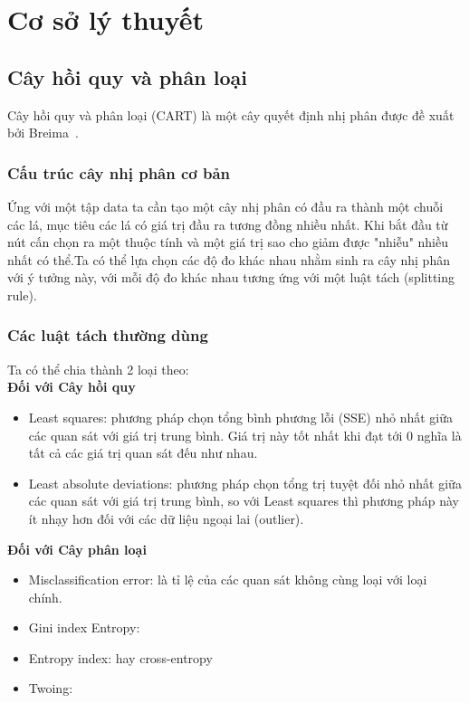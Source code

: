 \chapter{Cơ sở lý thuyết}
\section{Cây hồi quy và phân loại}
Cây hồi quy và phân loại (CART) là một cây quyết định nhị phân được đề xuất bởi Breima~\cite{1}.\\

\subsection{Cấu trúc cây nhị phân cơ bản}
 Ứng  với một tập data ta cần tạo một  cây nhị phân có đầu ra thành một chuỗi các lá, mục tiêu các lá có giá trị đầu ra tương đồng nhiều nhất. Khi bắt đầu từ nút cấn chọn ra một thuộc tính và một giá trị sao cho giảm được "nhiễu" nhiều nhất có thể.Ta có thể lựa chọn các độ đo khác nhau nhằm sinh ra cây nhị phân với ý tưởng này, với mỗi độ đo khác nhau tương ứng với một luật tách (splitting rule).\\
\subsection{Các luật tách thường dùng} Ta có thể chia thành 2 loại theo:\\
\textbf{Đối với Cây hồi quy} %
\begin{itemize}
\item Least squares: phương pháp chọn tổng bình phương lỗi (SSE) nhỏ nhất giữa các quan sát với giá trị trung bình. Giá trị này tốt nhất khi đạt tới 0 nghĩa là tất cả các giá trị quan sát đếu như nhau.
\item Least absolute deviations: phương pháp chọn tổng  trị tuyệt đối nhỏ nhất giữa các quan sát với giá trị trung bình, so với Least squares thì phương pháp này ít nhạy hơn đối với các dữ liệu ngoại lai (outlier). 
\end{itemize}
\textbf{Đối với Cây phân loại} %
\begin{itemize}
\item Misclassification error: là tỉ lệ của các quan sát không cùng loại với loại chính. 
\item Gini index  Entropy: %
\item Entropy index: hay cross-entropy %
\item Twoing:%
\end{itemize}

